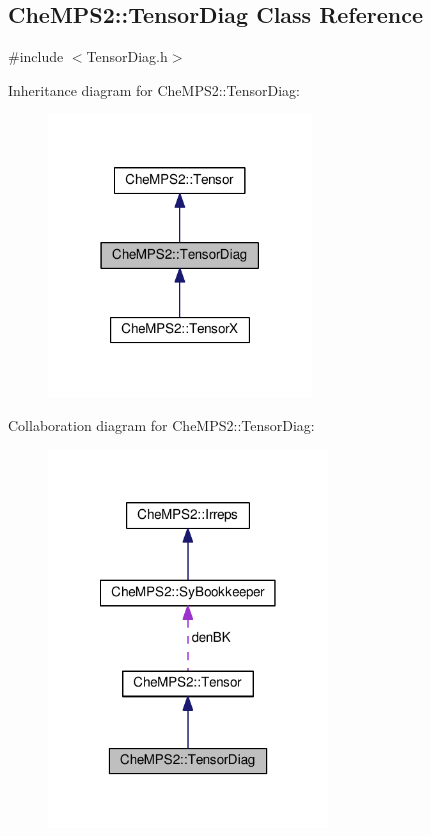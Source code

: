 \hypertarget{classCheMPS2_1_1TensorDiag}{\subsection{Che\-M\-P\-S2\-:\-:Tensor\-Diag Class Reference}
\label{classCheMPS2_1_1TensorDiag}
}


{\ttfamily \#include $<$Tensor\-Diag.\-h$>$}



Inheritance diagram for Che\-M\-P\-S2\-:\-:Tensor\-Diag\-:\nopagebreak
\begin{figure}[H]
\begin{center}
\leavevmode
\includegraphics[width=198pt]{classCheMPS2_1_1TensorDiag__inherit__graph}
\end{center}
\end{figure}


Collaboration diagram for Che\-M\-P\-S2\-:\-:Tensor\-Diag\-:\nopagebreak
\begin{figure}[H]
\begin{center}
\leavevmode
\includegraphics[width=210pt]{classCheMPS2_1_1TensorDiag__coll__graph}
\end{center}
\end{figure}
